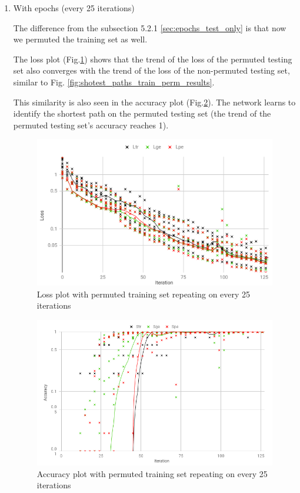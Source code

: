 \begin{enumerate}[label=(\Alph*)]
        \item With epochs (every 25 iterations)
        
        The difference from the subsection 5.2.1 \ref{sec:epochs_test_only} is that now we permuted the training set as well.
        
        The loss plot (Fig.\ref{fig:shotest_paths_epochs_perm_results}) shows that the trend of the loss of the permuted testing set also converges with the trend of the loss of the non-permuted testing set, similar to Fig. \ref{fig:shotest_paths_train_perm_results}.
        
        This similarity is also seen in the accuracy plot (Fig.\ref{fig:shotest_paths_epochs_perm_ACC_results}). The network learns to identify the shortest path on the permuted testing set (the trend of the permuted testing set's accuracy reaches 1).
        
        \begin{figure}[H]
            \centering
            \includegraphics[width=.9\linewidth]{fig/content/results/shortest_path/epochs_perm.png}
            \caption{Loss plot with permuted training set repeating on every 25 iterations}
            \label{fig:shotest_paths_epochs_perm_results}
        \end{figure}
        
        \begin{figure}[H]
            \centering
            \includegraphics[width=.9\linewidth]{fig/content/results/shortest_path/epochs_perm_ACC.png}
            \caption{Accuracy plot with permuted training set repeating on every 25 iterations}
            \label{fig:shotest_paths_epochs_perm_ACC_results}
        \end{figure}
        

\end{enumerate}
